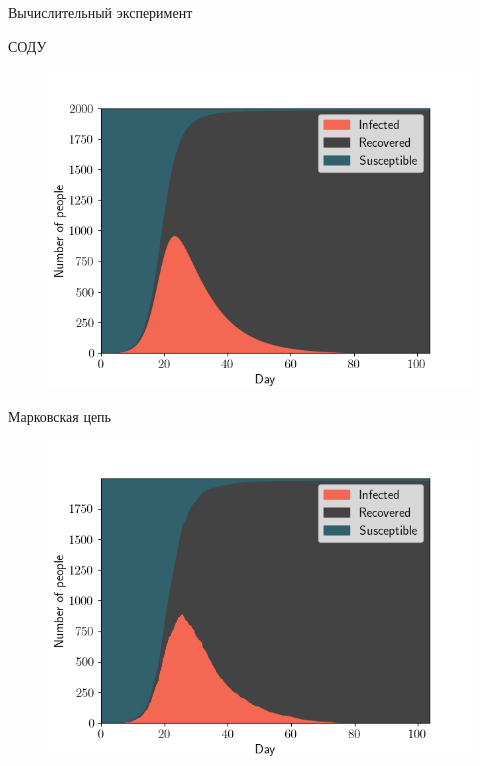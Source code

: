 \documentclass[aspectratio=169]{beamer}
\begin{document}
\begin{frame}{Вычислительный эксперимент}
\begin{center}
    \begin{minipage}[t]{0.47\columnwidth}
        \begin{center}
            СОДУ
        \end{center}
        \vspace{-0.5cm}
		\begin{figure}
			\centering
			\includegraphics[width=\linewidth]{slides/SIR.png}
		\end{figure}
	\end{minipage}
	\begin{minipage}[t]{0.47\columnwidth}
        \begin{center}
            Марковская цепь
        \end{center}
        \vspace{-0.5cm}
		\begin{figure}
			\centering
			\includegraphics[width=\linewidth]{slides/stochSIR.png}
		\end{figure}
	\end{minipage}
\end{center}
\end{frame}
\end{document}
